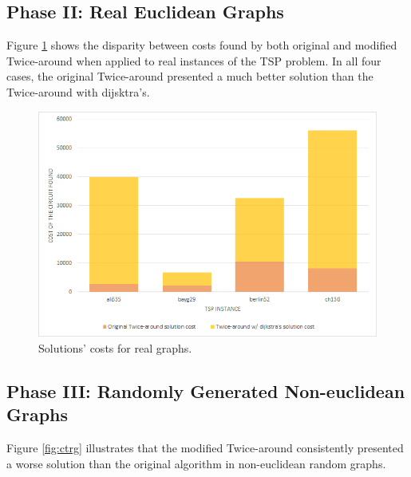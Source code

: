 \documentclass[journal]{IEEEtran}
\begin{document}
\subsection{Phase II: Real Euclidean Graphs}

Figure \ref{fig:ctrealg} shows the disparity between costs found by both original and modified Twice-around when applied to real instances of the TSP problem. In all four cases, the original Twice-around presented a much better solution than the Twice-around with dijsktra's.

\begin{figure}[H]
	\centering
	\includegraphics[width=.95\linewidth]{comparison-ta-real-graphs}
	\caption{Solutions' costs for real graphs.}
	\label{fig:ctrealg}
\end{figure}

\subsection{Phase III: Randomly Generated Non-euclidean Graphs}

Figure \ref{fig:ctrg} illustrates that the modified Twice-around consistently presented a worse solution than the original algorithm in non-euclidean random graphs.
\end{document}

